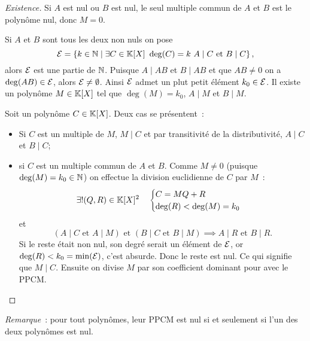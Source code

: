 \begin{proof}[Existence]
  Si \(A\) est nul ou \(B\) est nul, le seul multiple commun de \(A\) et \(B\)
  est le polynôme nul, donc \(M = 0\).

  Si \(A\) et \(B\) sont tous les deux non nuls on pose
  \begin{equation}
    \mathcal{E} = \left\{k \in \mathbb{N}\mathrel{}\middle|\mathrel{}\exists C \in \mathbb{K}[X] \ \deg(C) = k \ A\mid{}C \text{~et~}
    B\mid{}C\right\},
  \end{equation}
  alors \(\mathcal{E}\) est une partie de \(\mathbb{N}\). Puisque \(A\mid{}AB\) et \(B\mid{}AB\)
  et que \(AB \neq 0\) on a \(\deg(AB) \in \mathcal{E}\), alors \(\mathcal{E}\neq \emptyset\).
  Ainsi \(\mathcal{E}\) admet un plut petit élément \(k_0 \in \mathcal{E}\). Il existe un polynôme
  \(M \in \mathbb{K}[X]\) tel que \(\deg(M) = k_0\), \(A\mid{}M\) et \(B\mid{}M\).

  Soit un polynôme \(C \in \mathbb{K}[X]\). Deux cas se présentent~:
  \begin{itemize}
    \item Si \(C\) est un multiple de \(M\), \(M\mid{}C\) et par transitivité de
      la distributivité, \(A\mid{}C\) et \(B\mid{}C\);
    \item si \(C\) est un multiple commun de \(A\) et \(B\). Comme \(M \neq 0\)
      (puisque \(\deg(M) = k_0 \in \mathbb{N}\)) on effectue la division euclidienne de
      \(C\) par \(M\)~:
      \begin{equation}
        \exists! (Q,R) \in \mathbb{K}[X]^2 \quad \begin{cases} C = MQ+R \\ \deg(R) <
        \deg(M) = k_0 \end{cases}
      \end{equation}
      et
      \begin{equation}
        (A\mid{}C \text{~et~} A\mid{}M) \text{~et~} (B\mid{}C \text{~et~}
        B\mid{}M) \implies A\mid{}R \text{~et~} B\mid{}R.
      \end{equation}
      Si le reste était non nul, son degré serait un élément de \(\mathcal{E}\), or
      \(\deg(R) < k_0 = \min(\mathcal{E})\), c'est absurde. Donc le reste est nul. Ce qui
      signifie que \(M\mid{}C\). Ensuite on divise \(M\) par son coefficient
      dominant pour avec le PPCM.\@
  \end{itemize}
\end{proof}

\emph{Remarque}~: pour tout polynômes, leur PPCM est nul si et seulement si l'un
des deux polynômes est nul.

